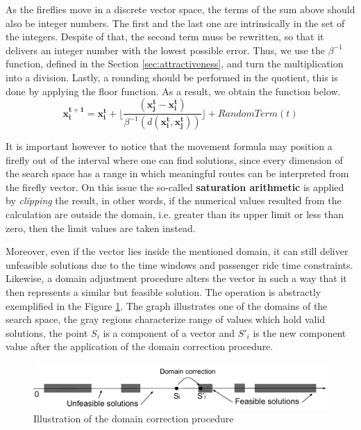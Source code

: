 \documentclass[tuberlin,cic,tc,openright,english,noabntcite,oneside]{iiufrgs}
\begin{document}
As the fireflies move in a discrete vector space, the terms of the sum above should also be integer numbers. The first and the last one are intrinsically in the set of the integers. Despite of that, the second term muss be rewritten, so that it delivers an integer number with the lowest possible error. Thus, we use the $\beta^{-1}$ function, defined in the Section \ref{sec:attractiveness}, and turn the multiplication into a division. Lastly, a rounding should be performed in the quotient, this is done by applying the floor function. As a result, we obtain the function below.
$$\mathbf{x^{t+1}_i} = \mathbf{x^{t}_i} +  \lfloor \frac{(\mathbf{x^{t}_j} - \mathbf{x^{t}_i})}{\beta^{-1}(d(\mathbf{x^{t}_i}, \mathbf{x^{t}_j}))} \rfloor + RandomTerm(t)$$

It is important however to notice that the movement formula may position a firefly out of the interval where one can find solutions, since every dimension of the search space has a range in which meaningful routes can be interpreted from the firefly vector. On this issue the so-called \textbf{saturation arithmetic} is applied by \emph{clipping} the result, in other words, if the numerical values resulted from the calculation are outside the domain, i.e. greater than its upper limit or less than zero, then the limit values are taken instead.

Moreover, even if the vector lies inside the mentioned domain, it can still deliver unfeasible solutions due to the time windows and passenger ride time constraints. Likewise, a domain adjustment procedure alters the vector in such a way that it then represents a similar but feasible solution. The operation is abstractly exemplified in the Figure \ref{fig:solution_domain}. The graph illustrates one of the domains of the search space, the gray regions characterize range of values which hold valid solutions, the point $S_i$ is a component of a vector and $S'_i$ is the new component value after the application of the domain correction procedure.

\begin{figure}[H]
	\centering
    \caption{Illustration of the domain correction procedure}
    \includegraphics[width=\textwidth]{fig_solution_domain}\par
    \label{fig:solution_domain}
\end{figure}
\end{document}
